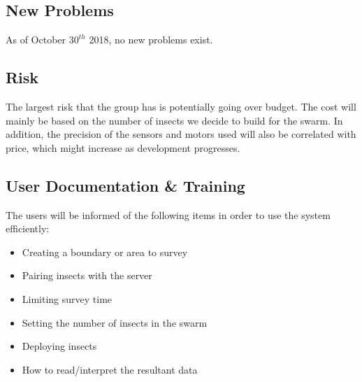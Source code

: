 \documentclass[11pt]{article}
\begin{document}
\subsection{New Problems}
As of October $30^{th}$ 2018, no new problems exist.
\subsection{Risk}
The largest risk that the group has is potentially going over budget. The cost will mainly be based on the number of insects we decide to build for the swarm. In addition, the precision of the sensors and motors used will also be correlated with price, which might increase as development progresses. 

\subsection{User Documentation \& Training}
The users will be informed of the following items in order to use the system efficiently:
\begin{itemize}
    \item Creating a boundary or area to survey
    \item Pairing insects with the server
    \item Limiting survey time
    \item Setting the number of insects in the swarm
    \item Deploying insects 
    \item How to read/interpret the resultant data
\end{itemize}
\end{document}
